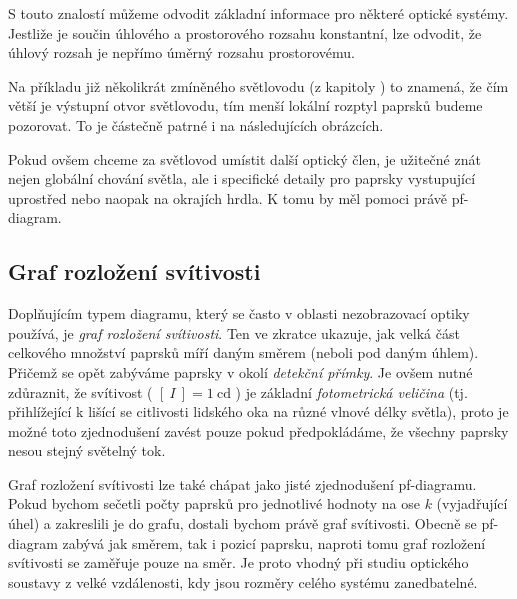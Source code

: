 S touto znalostí můžeme odvodit základní informace pro některé optické systémy. Jestliže je součin úhlového a prostorového rozsahu konstantní, lze odvodit, že úhlový rozsah je nepřímo úměrný rozsahu prostorovému. 

Na příkladu již několikrát zmíněného světlovodu (z kapitoly ) to znamená, že čím větší je výstupní otvor světlovodu, tím menší lokální rozptyl paprsků budeme pozorovat. To je částečně patrné i na následujících obrázcích.


Pokud ovšem chceme za světlovod umístit další optický člen, je užitečné znát nejen globální chování světla, ale i specifické detaily pro paprsky vystupující uprostřed nebo naopak na okrajích hrdla. K tomu by měl pomoci právě pf-diagram.


\subsection{Graf rozložení svítivosti}

Doplňujícím typem diagramu, který se často v oblasti nezobrazovací optiky používá, je \emph{graf rozložení svítivosti}. Ten ve zkratce ukazuje, jak velká část celkového množství paprsků míří daným směrem (neboli pod daným úhlem). Přičemž se opět zabýváme paprsky v okolí \emph{detekční přímky}. Je ovšem nutné zdůraznit, že svítivost ( $[\ I\ ] = 1\ \mathrm{cd}$ ) je základní \emph{fotometrická veličina} (tj. přihlížející k lišící se citlivosti lidského oka na různé vlnové délky světla), proto je možné toto zjednodušení zavést pouze pokud předpokládáme, že všechny paprsky nesou stejný světelný tok.

Graf rozložení svítivosti lze také chápat jako jisté zjednodušení pf-diagramu. Pokud bychom sečetli počty paprsků pro jednotlivé hodnoty na ose $k$ (vyjadřující úhel) a zakreslili je do grafu, dostali bychom právě graf svítivosti. Obecně se pf-diagram zabývá jak směrem, tak i pozicí paprsku, naproti tomu graf rozložení svítivosti se zaměřuje pouze na směr. Je proto vhodný při studiu optického soustavy z velké vzdálenosti, kdy jsou rozměry celého systému zanedbatelné.

